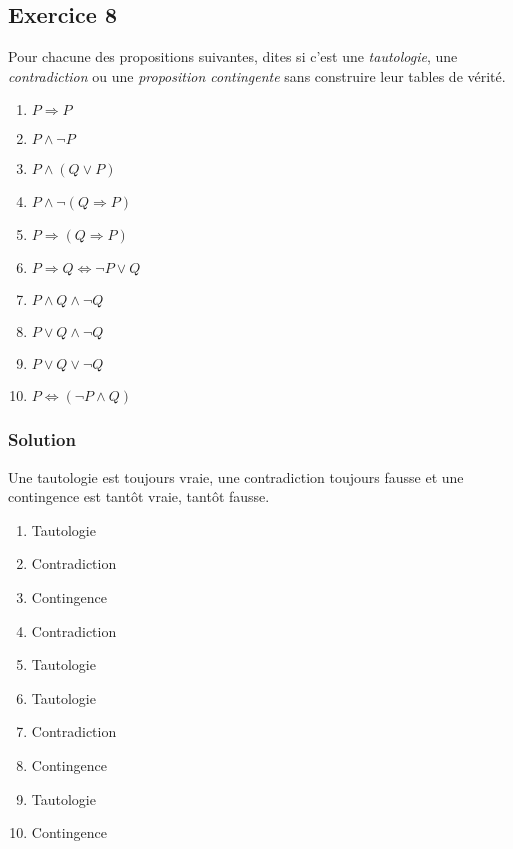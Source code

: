 \subsection*{Exercice 8}
Pour chacune des propositions suivantes, dites si c'est une
\textit{tautologie}, une \textit{contradiction} ou une \textit{proposition contingente}
sans construire leur tables de vérité.
\begin{enumerate}
	\item $P \Rightarrow P$
	\item $P \land \neg P$
	\item $P \land (Q \lor P)$
	\item $P \land \neg (Q \Rightarrow P)$
	\item $P \Rightarrow (Q \Rightarrow P)$
	\item $P \Rightarrow Q \Leftrightarrow \neg P \lor Q$
	\item $P \land Q \land \neg Q$
	\item $P \lor Q \land \neg Q$
	\item $P \lor Q \lor \neg Q$
	\item $P \Leftrightarrow (\neg P \land Q)$
\end{enumerate}


\subsubsection*{Solution}


    Une tautologie est toujours vraie, une contradiction toujours fausse et une contingence est tantôt vraie, tantôt fausse.

    \begin{enumerate}
        \item Tautologie
        \item Contradiction
        \item Contingence
        \item Contradiction
        \item Tautologie
        \item Tautologie
        \item Contradiction
        \item Contingence
        \item Tautologie
        \item Contingence
    \end{enumerate}
    
